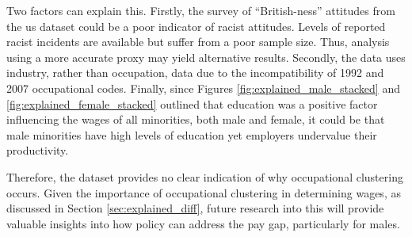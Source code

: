 \documentclass[class=article, crop=false]{standalone}
\begin{document}
Two factors can explain this. Firstly, the survey of \enquote{British-ness} attitudes from the \acrlong{us} dataset could be a poor indicator of racist attitudes. Levels of reported racist incidents are available but suffer from a poor sample size. Thus, analysis using a more accurate proxy may yield alternative results. Secondly, the data uses industry, rather than occupation, data due to the incompatibility of 1992 and 2007 occupational codes. Finally, since Figures \ref{fig:explained_male_stacked} and \ref{fig:explained_female_stacked} outlined that education was a positive factor influencing the wages of all minorities, both male and female, it could be that male minorities have high levels of education yet employers undervalue their productivity.

Therefore, the dataset provides no clear indication of why occupational clustering occurs. Given the importance of occupational clustering in determining wages, as discussed in Section \ref{sec:explained_diff}, future research into this will provide valuable insights into how policy can address the pay gap, particularly for males.

\end{document}
